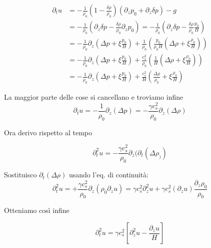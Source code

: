 \documentclass{report}
\begin{document}
\begin{align}
    \partial_t u &= -\frac{1}{\rho_0}\left(1 - \frac{\delta\rho}{\rho_0} \right)\left(\partial_z p_0 + \partial_z \delta p \right) - g \\
    &= -\frac{1}{\rho_0}\left(\partial_z \delta p - \frac{\delta \rho}{\rho_0}\partial_zp_0 \right) = -\frac{1}{\rho_0}\left(\partial_z \delta p - \frac{\delta\rho}{\rho_0}\frac{p_0}{H} \right) \\ &= -\frac{1}{\rho_0}\partial_z\left(\Delta p + \xi \frac{p_0}{H}\right) + \frac{1}{\rho_0}\left(\frac{p_0}{\rho_0 H} (\Delta \rho + \xi \frac{\rho_0}{H})\right) \\ & = -\frac{1}{\rho_0}\partial_z\left(\Delta p + \xi \frac{p_0}{H}\right) + \frac{c_s^2}{\rho_0}\left(\frac{1}{H} (\Delta \rho + \xi \frac{\rho_0}{H})\right) \\
    &= -\frac{1}{\rho_0}\partial_z\left(\Delta p + \xi \frac{p_0}{H}\right) + \frac{c_s^2}{H}\left(\frac{\Delta \rho}{\rho_0} + \xi \frac{\rho_0}{H}\right)
\end{align}

La maggior parte delle cose si cancellano e troviamo infine 
\begin{equation}
    \partial_tu = -\frac{1}{\rho_0}\partial_z(\Delta p) = -\frac{\gamma c_s^2}{\rho_0}\partial_z(\Delta \rho)
\end{equation}

Ora derivo rispetto al tempo

\begin{equation}
    \partial_t^2 u = -\frac{\gamma c_s^2}{\rho_0}\partial_z(\partial_t(\Delta\rho_))
\end{equation}

Sostituisco $\partial_t(\Delta \rho)$ usando l'eq. di continuità: 
\begin{equation}
    \partial_t^2 u = +\frac{\gamma c_s^2}{\rho_0}\partial_z(\rho_0 \partial_zu) = \gamma c_s^2 \partial_z^2 u + \gamma c_s^2 (\partial_zu)\frac{\partial_z\rho_0}{\rho_0}
\end{equation}

Otteniamo così infine 

\begin{tcolorbox}[colback=myg!15, colframe=black, boxrule=1pt]
\begin{equation}
    \partial_t^2u = \gamma c_s^2 \left[\partial_z^2u - \frac{\partial_z u}{H}\right]
\end{equation}
\end{tcolorbox}
\end{document}
